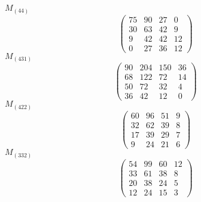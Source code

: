 \documentclass[12pt,reqno]{amsart}
\begin{document}
$M_{(44)}$                             $$ \begin{pmatrix} 
                         75 & 90 & 27 & 0 \\[6pt]
                         30 & 63 & 42 & 9 \\[6pt]
                         9 & 42 & 42 & 12 \\[6pt]
                           0 & 27 & 36 & 12
                              \end{pmatrix} $$ 
$M_{(431)}$                             $$ \begin{pmatrix} 
                        90 & 204 & 150 & 36 \\[6pt]
                        68 & 122 & 72 & 14 \\[6pt]
                         50 & 72 & 32 & 4 \\[6pt]
                           36 & 42 & 12 & 0
                              \end{pmatrix} $$ 
$M_{(422)}$                             $$ \begin{pmatrix} 
                         60 & 96 & 51 & 9 \\[6pt]
                         32 & 62 & 39 & 8 \\[6pt]
                         17 & 39 & 29 & 7 \\[6pt]
                            9 & 24 & 21 & 6
                              \end{pmatrix} $$ 
$M_{(332)}$                             $$ \begin{pmatrix} 
                         54 & 99 & 60 & 12 \\[6pt]
                         33 & 61 & 38 & 8 \\[6pt]
                         20 & 38 & 24 & 5 \\[6pt]
                           12 & 24 & 15 & 3
                              \end{pmatrix} $$ 
\end{document}
